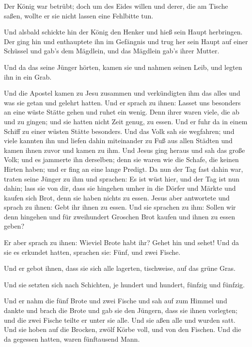  Der König war betrübt; doch um des Eides willen und
derer, die am Tische saßen, wollte er sie nicht lassen eine Fehlbitte
tun.

 Und alsbald schickte hin der König den Henker und hieß
sein Haupt herbringen. Der ging hin und enthauptete ihn im Gefängnis
 und trug her sein Haupt auf einer Schüssel und gab's dem
Mägdlein, und das Mägdlein gab's ihrer Mutter.

 Und da das seine Jünger hörten, kamen sie und nahmen
seinen Leib, und legten ihn in ein Grab.

 Und die Apostel kamen zu Jesu zusammen und verkündigten
ihm das alles und was sie getan und gelehrt hatten.  Und
er sprach zu ihnen: Lasset uns besonders an eine wüste Stätte gehen und
ruhet ein wenig. Denn ihrer waren viele, die ab und zu gingen; und sie
hatten nicht Zeit genug, zu essen.  Und er fuhr da in
einem Schiff zu einer wüsten Stätte besonders.  Und das
Volk sah sie wegfahren; und viele kannten ihn und liefen dahin
miteinander zu Fuß aus allen Städten und kamen ihnen zuvor und kamen zu
ihm.  Und Jesus ging heraus und sah das große Volk; und
es jammerte ihn derselben; denn sie waren wie die Schafe, die keinen
Hirten haben; und er fing an eine lange Predigt.  Da nun
der Tag fast dahin war, traten seine Jünger zu ihm und sprachen: Es ist
wüst hier, und der Tag ist nun dahin;  lass sie von dir,
dass sie hingehen umher in die Dörfer und Märkte und kaufen sich Brot,
denn sie haben nichts zu essen.  Jesus aber antwortete
und sprach zu ihnen: Gebt ihr ihnen zu essen. Und sie sprachen zu ihm:
Sollen wir denn hingehen und für zweihundert Groschen Brot kaufen und
ihnen zu essen geben?

 Er aber sprach zu ihnen: Wieviel Brote habt ihr? Gehet
hin und sehet! Und da sie es erkundet hatten, sprachen sie: Fünf, und
zwei Fische.

 Und er gebot ihnen, dass sie sich alle lagerten,
tischweise, auf das grüne Gras.

 Und sie setzten sich nach Schichten, je hundert und
hundert, fünfzig und fünfzig.

 Und er nahm die fünf Brote und zwei Fische und sah auf
zum Himmel und dankte und brach die Brote und gab sie den Jüngern, dass
sie ihnen vorlegten; und die zwei Fische teilte er unter sie alle.
 Und sie aßen alle und wurden satt.  Und
sie hoben auf die Brocken, zwölf Körbe voll, und von den Fischen.
 Und die da gegessen hatten, waren fünftausend Mann.

